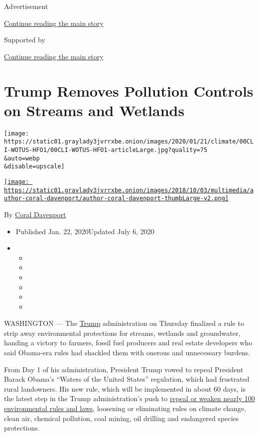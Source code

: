 Advertisement

\protect\hyperlink{after-top}{Continue reading the main story}

Supported by

\protect\hyperlink{after-sponsor}{Continue reading the main story}

\hypertarget{trump-removes-pollution-controls-on-streams-and-wetlands}{%
\section{Trump Removes Pollution Controls on Streams and
Wetlands}\label{trump-removes-pollution-controls-on-streams-and-wetlands}}

\texttt{[image: https://static01.graylady3jvrrxbe.onion/images/2020/01/21/climate/00CLI-WOTUS-HFO1/00CLI-WOTUS-HFO1-articleLarge.jpg?quality=75\\\&auto=webp\\\&disable=upscale]}

\href{https://www.nytimes3xbfgragh.onion/by/coral-davenport}{\texttt{[image: https://static01.graylady3jvrrxbe.onion/images/2018/10/03/multimedia/author-coral-davenport/author-coral-davenport-thumbLarge-v2.png]}}

By \href{https://www.nytimes3xbfgragh.onion/by/coral-davenport}{Coral
Davenport}

\begin{itemize}
\item
  Published Jan. 22, 2020Updated July 6, 2020
\item
  \begin{itemize}
  \item
  \item
  \item
  \item
  \item
  \item
  \end{itemize}
\end{itemize}

WASHINGTON --- The
\href{https://www.nytimes3xbfgragh.onion/2020/07/06/us/politics/trump-lobbyists-swamp-campaign.html}{Trump}
administration on Thursday finalized a rule to strip away environmental
protections for streams, wetlands and groundwater, handing a victory to
farmers, fossil fuel producers and real estate developers who said
Obama-era rules had shackled them with onerous and unnecessary burdens.

From Day 1 of his administration, President Trump vowed to repeal
President Barack Obama's ``Waters of the United States'' regulation,
which had frustrated rural landowners. His new rule, which will be
implemented in about 60 days, is the latest step in the Trump
administration's push to
\href{https://www.nytimes3xbfgragh.onion/interactive/2019/climate/trump-environment-rollbacks.html}{repeal
or weaken nearly 100 environmental rules and laws}, loosening or
eliminating rules on climate change, clean air, chemical pollution, coal
mining, oil drilling and endangered species protections.


